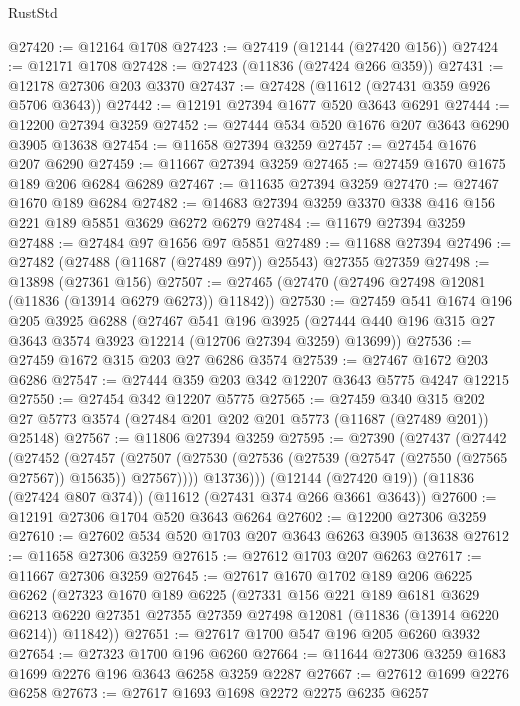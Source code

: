 \begin{lexlean}{RustStd}
\begin{coremodule}
@27420 := @12164 @1708
@27423 := @27419 (@12144 (@27420 @156))
@27424 := @12171 @1708
@27428 := @27423 (@11836 (@27424 @266 @359))
@27431 := @12178 @27306 @203 @3370
@27437 := @27428 (@11612 (@27431 @359 @926 @5706 @3643))
@27442 := @12191 @27394 @1677 @520 @3643 @6291
@27444 := @12200 @27394 @3259
@27452 := @27444 @534 @520 @1676 @207 @3643 @6290 @3905 @13638
@27454 := @11658 @27394 @3259
@27457 := @27454 @1676 @207 @6290
@27459 := @11667 @27394 @3259
@27465 := @27459 @1670 @1675 @189 @206 @6284 @6289
@27467 := @11635 @27394 @3259
@27470 := @27467 @1670 @189 @6284
@27482 := @14683 @27394 @3259 @3370 @338 @416 @156 @221 @189 @5851 @3629 @6272 @6279
@27484 := @11679 @27394 @3259
@27488 := @27484 @97 @1656 @97 @5851
@27489 := @11688 @27394
@27496 := @27482 (@27488 (@11687 (@27489 @97)) @25543) @27355 @27359
@27498 := @13898 (@27361 @156)
@27507 := @27465 (@27470 (@27496 @27498 @12081 (@11836 (@13914 @6279 @6273)) @11842))
@27530 := @27459
    @541
    @1674
    @196
    @205
    @3925
    @6288
    (@27467
      @541
      @196
      @3925
      (@27444 @440 @196 @315 @27 @3643 @3574 @3923 @12214 (@12706 @27394 @3259) @13699))
@27536 := @27459 @1672 @315 @203 @27 @6286 @3574
@27539 := @27467 @1672 @203 @6286
@27547 := @27444 @359 @203 @342 @12207 @3643 @5775 @4247 @12215
@27550 := @27454 @342 @12207 @5775
@27565 := @27459
    @340
    @315
    @202
    @27
    @5773
    @3574
    (@27484 @201 @202 @201 @5773 (@11687 (@27489 @201)) @25148)
@27567 := @11806 @27394 @3259
@27595 := @27390
    (@27437
      (@27442
        (@27452
          (@27457
            (@27507 (@27530 (@27536 (@27539 (@27547 (@27550 (@27565 @27567)) @15635)) @27567))))
          @13736)))
    (@12144 (@27420 @19))
    (@11836 (@27424 @807 @374))
    (@11612 (@27431 @374 @266 @3661 @3643))
@27600 := @12191 @27306 @1704 @520 @3643 @6264
@27602 := @12200 @27306 @3259
@27610 := @27602 @534 @520 @1703 @207 @3643 @6263 @3905 @13638
@27612 := @11658 @27306 @3259
@27615 := @27612 @1703 @207 @6263
@27617 := @11667 @27306 @3259
@27645 := @27617
    @1670
    @1702
    @189
    @206
    @6225
    @6262
    (@27323
      @1670
      @189
      @6225
      (@27331
        @156
        @221
        @189
        @6181
        @3629
        @6213
        @6220
        @27351
        @27355
        @27359
        @27498
        @12081
        (@11836 (@13914 @6220 @6214))
        @11842))
@27651 := @27617 @1700 @547 @196 @205 @6260 @3932
@27654 := @27323 @1700 @196 @6260
@27664 := @11644 @27306 @3259 @1683 @1699 @2276 @196 @3643 @6258 @3259 @2287
@27667 := @27612 @1699 @2276 @6258
@27673 := @27617 @1693 @1698 @2272 @2275 @6235 @6257

\end{coremodule}
\end{lexlean}
